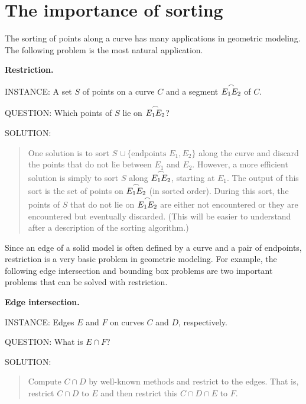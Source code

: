 \section{The importance of sorting}
The sorting of points along a curve has many applications 
in geometric modeling. 
The following problem is the most natural application.

\vspace{.2in}

{\bf Restriction.}

INSTANCE: A set $S$ of points on a curve $C$ and a segment $\mbox{$\stackrel{\frown}{E_{1}E_{2}}$}$ of $C$.

QUESTION: Which points of $S$ lie on $\mbox{$\stackrel{\frown}{E_{1}E_{2}}$}$? 

SOLUTION: 
\begin{quote}
	One solution is to sort $S$ $\cup\ \{\mbox{endpoints } E_{1},E_{2}\}$ along the curve
	and discard the points that do not lie between $E_{1}$ and $E_{2}$.
	However, a more efficient solution is simply to sort $S$ along $\mbox{$\stackrel{\frown}{E_{1}E_{2}}$}$, 
	starting at $E_{1}$.  
	The output of this sort is the set of points on $\mbox{$\stackrel{\frown}{E_{1}E_{2}}$}$ (in sorted order).
	During this sort, the points of $S$ that do not lie on $\mbox{$\stackrel{\frown}{E_{1}E_{2}}$}$ are either 
	not encountered or they are encountered but eventually discarded. 
	(This will be easier to understand after a description of the sorting algorithm.)
\end{quote}
\vspace{.25in}

Since an edge of a solid model is often defined by a curve and a pair of endpoints,
restriction is a very basic problem in geometric modeling.
For example, the following edge intersection and bounding box problems are two important 
problems that can be solved with restriction.

\vspace{.2in}

{\bf Edge intersection.}

INSTANCE: Edges $E$ and $F$ on curves $C$ and $D$, respectively.

QUESTION: What is $E \cap F$?

{\samepage
SOLUTION: 
\begin{quote}
Compute $C \cap D$ by well-known methods and restrict to the edges.
	That is, restrict $C \cap D$ to $E$ and then restrict this $C \cap D \cap E$ to $F$.
\end{quote}

}
\vspace{.2in}

